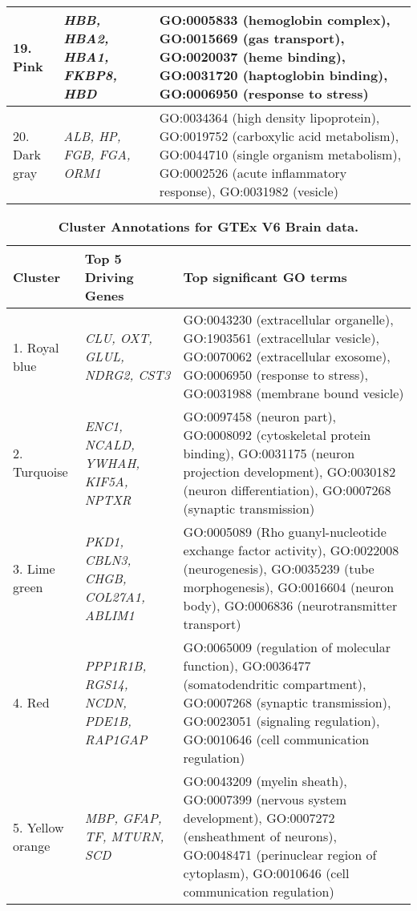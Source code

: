 \begin{table}[!hp]
\begin{adjustwidth}{-.5in}{0in}
\begin{tabular}{|p{1.0in}|p{1.5in}|p{4.3in}|}
19. Pink & \textit{HBB, HBA2, HBA1, FKBP8, HBD} & GO:0005833 (hemoglobin complex), GO:0015669 (gas transport), GO:0020037 (heme binding), GO:0031720 (haptoglobin binding), GO:0006950 (response to stress) \\ \hline 
20. Dark gray  & \textit{ALB, HP, FGB, FGA, ORM1} & GO:0034364 (high density lipoprotein), GO:0019752 (carboxylic acid metabolism), GO:0044710 (single organism metabolism), GO:0002526 (acute inflammatory response), GO:0031982 (vesicle) \\ \hline 
\end{tabular} \label{tab:tab1}
\end{adjustwidth}
\end{table} 





\begin{table}[!hp]
\begin{adjustwidth}{-.50in}{0in} %
\footnotesize
\centering
\caption{\bf Cluster Annotations for GTEx V6 Brain data.}
\renewcommand{\arraystretch}{1.7}
\begin{tabular}{|p{1.0in}|p{1.5in}|p{4.3in}|} 
 \hline
 Cluster & Top 5 Driving \qquad Genes  &  Top significant GO terms \\
\hline
 1. Royal blue &  \textit{CLU, OXT,  GLUL, NDRG2, CST3} & GO:0043230 (extracellular organelle), GO:1903561 (extracellular vesicle), GO:0070062 (extracellular exosome), GO:0006950 (response to stress), GO:0031988 (membrane bound vesicle) \\ 
 \hline
2. Turquoise & \textit{ENC1, NCALD, YWHAH, KIF5A, NPTXR} & GO:0097458 (neuron part), GO:0008092 (cytoskeletal protein binding), GO:0031175 (neuron projection development), GO:0030182 (neuron differentiation), GO:0007268 (synaptic transmission) \\
\hline
 3. Lime green & \textit{PKD1, CBLN3, CHGB, COL27A1, ABLIM1} & GO:0005089 (Rho guanyl-nucleotide exchange factor activity), GO:0022008 (neurogenesis), GO:0035239 (tube morphogenesis), GO:0016604 (neuron body), GO:0006836 (neurotransmitter transport) \\
\hline
4. Red & \textit{PPP1R1B, RGS14, NCDN, PDE1B, RAP1GAP} & GO:0065009 (regulation of molecular function), GO:0036477 (somatodendritic compartment), GO:0007268 (synaptic transmission), GO:0023051 (signaling regulation), GO:0010646 (cell communication regulation) \\
\hline	
5. Yellow orange & \textit{MBP, GFAP, TF, MTURN, SCD} & GO:0043209 (myelin sheath), GO:0007399 (nervous system development), GO:0007272 (ensheathment of neurons), GO:0048471 (perinuclear region of cytoplasm), GO:0010646 (cell communication regulation)\\

\end{tabular}
\end{adjustwidth}
\end{table}
